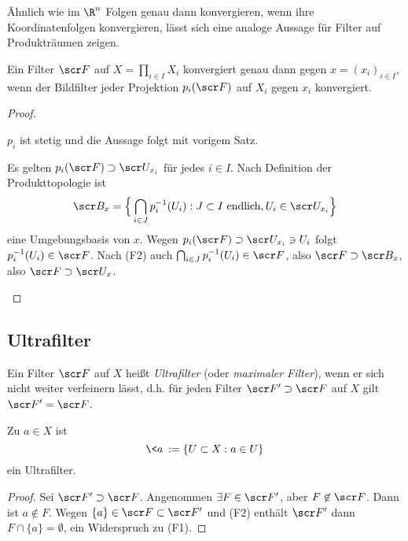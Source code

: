 Ähnlich wie im $\R^n$ Folgen genau dann konvergieren, wenn ihre Koordinatenfolgen konvergieren, lässt sich eine analoge Aussage für Filter auf Produkträumen zeigen.

\begin{st}
	Ein Filter $\scr F$ auf $X = \prod_{i\in I} X_i$ konvergiert genau dann gegen $x = (x_i)_{i\in I}$, wenn der Bildfilter jeder Projektion $p_i(\scr F)$ auf $X_i$ gegen $x_i$ konvergiert.
	\begin{proof}
		\begin{segnb}[„$\implies$“]
			$p_i$ ist stetig und die Aussage folgt mit vorigem Satz. %
		\end{segnb}
		\begin{segnb}[„$\impliedby$“]
			Es gelten $p_i(\scr F) \supset \scr U_{x_i}$ für jedes $i \in I$.
			Nach Definition der Produkttopologie ist
			\[
				\scr B_x = \Big\{ \bigcap_{i\in J} p_i^{-1}(U_i) : J \subset I \text{ endlich}, U_i \in \scr U_{x_i} \Big\}
			\]
			eine Umgebungsbasis von $x$.
			Wegen $p_i(\scr F) \supset \scr U_{x_i} \ni U_i$ folgt $p_i^{-1}(U_i) \in \scr F$.
			Nach (F2) auch $\bigcap_{i\in J} p_i^{-1}(U_i) \in \scr F$, also $\scr F \supset \scr B_x$, also $\scr F \supset \scr U_x$.
		\end{segnb}
	\end{proof}
\end{st}

\subsection{Ultrafilter}

\begin{df}[Ultrafilter]
	Ein Filter $\scr F$ auf $X$ heißt \emph{Ultrafilter} (oder \emph{maximaler Filter}), wenn er sich nicht weiter verfeinern lässt,
	d.h. für jeden Filter $\scr F' \supset \scr F$ auf $X$ gilt $\scr F' = \scr F$.
\end{df}

\begin{ex}
	Zu $a \in X$ ist
	\[
		\<a\> := \{ U \subset X : a \in U \}
	\]
	ein Ultrafilter.
	\begin{proof}
		Sei $\scr F' \supset \scr F$.
		Angenommen $\exists F \in \scr F'$, aber $F \not\in \scr F$.
		Dann ist $a \not\in F$.
		Wegen $\{a\} \in \scr F \subset \scr F'$ und (F2) enthält $\scr F'$ dann $F \cap \{a\} = \emptyset$, ein Widerspruch zu (F1).
	\end{proof}
\end{ex}

